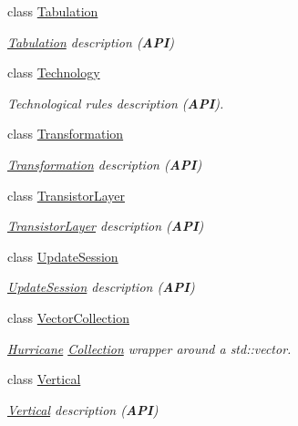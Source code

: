 \begin{DoxyCompactItemize}
class \mbox{\hyperlink{classHurricane_1_1Tabulation}{Tabulation}}
\begin{DoxyCompactList}\small\item\em \mbox{\hyperlink{classHurricane_1_1Tabulation}{Tabulation}} description ({\bfseries A\+PI}) \end{DoxyCompactList}\item 
class \mbox{\hyperlink{classHurricane_1_1Technology}{Technology}}
\begin{DoxyCompactList}\small\item\em Technological rules description ({\bfseries A\+PI}). \end{DoxyCompactList}\item 
class \mbox{\hyperlink{classHurricane_1_1Transformation}{Transformation}}
\begin{DoxyCompactList}\small\item\em \mbox{\hyperlink{classHurricane_1_1Transformation}{Transformation}} description ({\bfseries A\+PI}) \end{DoxyCompactList}\item 
class \mbox{\hyperlink{classHurricane_1_1TransistorLayer}{Transistor\+Layer}}
\begin{DoxyCompactList}\small\item\em \mbox{\hyperlink{classHurricane_1_1TransistorLayer}{Transistor\+Layer}} description ({\bfseries A\+PI}) \end{DoxyCompactList}\item 
class \mbox{\hyperlink{classHurricane_1_1UpdateSession}{Update\+Session}}
\begin{DoxyCompactList}\small\item\em \mbox{\hyperlink{classHurricane_1_1UpdateSession}{Update\+Session}} description ({\bfseries A\+PI}) \end{DoxyCompactList}\item 
class \mbox{\hyperlink{classHurricane_1_1VectorCollection}{Vector\+Collection}}
\begin{DoxyCompactList}\small\item\em \mbox{\hyperlink{namespaceHurricane}{Hurricane}} \mbox{\hyperlink{classHurricane_1_1Collection}{Collection}} wrapper around a std\+::vector. \end{DoxyCompactList}\item 
class \mbox{\hyperlink{classHurricane_1_1Vertical}{Vertical}}
\begin{DoxyCompactList}\small\item\em \mbox{\hyperlink{classHurricane_1_1Vertical}{Vertical}} description ({\bfseries A\+PI}) \end{DoxyCompactList}\item 

\end{DoxyCompactItemize}
